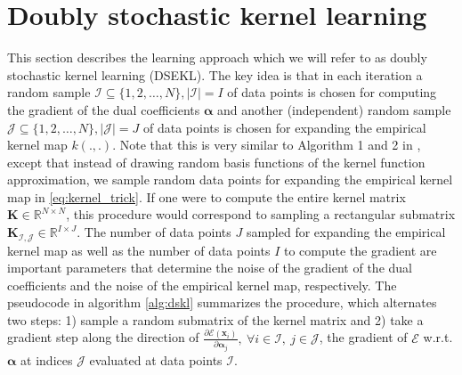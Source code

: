 \documentclass{article} %
\newcommand{\R}{\ensuremath{\mathds{R}}}
\newcommand{\va}{\boldsymbol{\alpha}}
\renewcommand{\vec}[1]{\mathbf{#1}}
\begin{document}
\section{Doubly stochastic kernel learning}\label{sec:dskl}
This section describes the learning approach which we will refer to as doubly stochastic kernel learning (DSEKL). The key idea is that in each iteration a random sample $\mathcal{I}\subseteq\{1,2,\dots,N\}, |\mathcal{I}|=I$ of data points is chosen for computing the gradient of the dual coefficients $\va$ and another (independent) random sample  $\mathcal{J}\subseteq\{1,2,\dots,N\}, |\mathcal{J}|=J$ of data points is chosen for expanding the empirical kernel map $k(.,.)$. Note that this is very similar to Algorithm 1 and 2 in \cite{Dai2014}, except that instead of drawing random basis functions of the kernel function approximation, we sample random data points for expanding the empirical kernel map in \autoref{eq:kernel_trick}. If one were to compute the entire kernel matrix $\vec{K}\in\R^{N\times N}$, this procedure would correspond to sampling a rectangular submatrix $\vec{K}_{\mathcal{I,J}}\in\R^{I\times J}$. The number of data points $J$ sampled for expanding the empirical kernel map as well as the number of data points $I$ to compute the gradient are important parameters that determine the noise of the gradient of the dual coefficients and the noise of the empirical kernel map, respectively. The pseudocode in algorithm \autoref{alg:dskl} summarizes the procedure, which alternates two steps: 1) sample a random submatrix of the kernel matrix and 2) take a gradient step along the direction of $\frac{\partial\mathcal{E}(\vec{x}_i)}{\partial \va_{j}},~\forall i\in \mathcal{I},~j\in\mathcal{J} $, the gradient of $\mathcal{E}$ w.r.t. $\va$ at indices $\mathcal{J}$ evaluated at data points $\mathcal{I}$.
\end{document}
